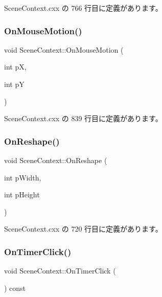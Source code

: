  Scene\+Context.\+cxx の 766 行目に定義があります。

\mbox{\label{class_scene_context_ad684c731a852c7af58a433b596564d82}} 
\subsubsection{\texorpdfstring{On\+Mouse\+Motion()}{OnMouseMotion()}}
{\footnotesize\ttfamily void Scene\+Context\+::\+On\+Mouse\+Motion (\begin{DoxyParamCaption}\item[{int}]{pX,  }\item[{int}]{pY }\end{DoxyParamCaption})}



 Scene\+Context.\+cxx の 839 行目に定義があります。

\mbox{\label{class_scene_context_ab90174ca8b46fd0605bdafa2feb34bbb}} 
\subsubsection{\texorpdfstring{On\+Reshape()}{OnReshape()}}
{\footnotesize\ttfamily void Scene\+Context\+::\+On\+Reshape (\begin{DoxyParamCaption}\item[{int}]{p\+Width,  }\item[{int}]{p\+Height }\end{DoxyParamCaption})}



 Scene\+Context.\+cxx の 720 行目に定義があります。

\mbox{\label{class_scene_context_ad2cd3fb0710e845b5cc7ad3cfc8abaeb}} 
\subsubsection{\texorpdfstring{On\+Timer\+Click()}{OnTimerClick()}}
{\footnotesize\ttfamily void Scene\+Context\+::\+On\+Timer\+Click (\begin{DoxyParamCaption}{ }\end{DoxyParamCaption}) const}



